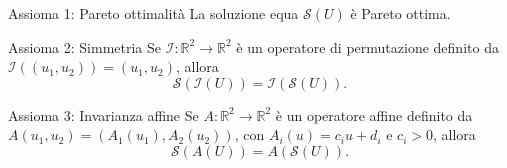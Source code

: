 \documentclass{beamer}
\begin{document}
\begin{frame}
	\begin{exampleblock}{Assioma 1: Pareto ottimalità} \label{ax1}
		La soluzione equa $\mathcal{S}(U)$ è Pareto ottima.
	\end{exampleblock}
	\begin{exampleblock}{Assioma 2: Simmetria} \label{ax2}
		Se $\mathcal{I}:\mathbb{R}^2 \rightarrow \mathbb{R}^2$ è un operatore di permutazione definito da $\mathcal{I}((u_1,u_2)) = (u_1,u_2)$, allora 
		\begin{equation}
			\mathcal{S}(\mathcal{I}(U)) = \mathcal{I}(\mathcal{S}(U)).
		\end{equation}
	\end{exampleblock}
	\begin{exampleblock}{Assioma 3: Invarianza affine} \label{ax3}
		Se $A: \mathbb{R}^2 \rightarrow \mathbb{R}^2$ è un operatore affine definito da $A(u_1,u_2) = (A_1(u_1),A_2(u_2))$, con $A_i(u) = c_iu + d_i$ e $c_i>0$, allora 
		\begin{equation}
			\mathcal{S}(A(U)) = A(\mathcal{S}(U)).
		\end{equation}
	\end{exampleblock}
\end{frame}
\end{document}
